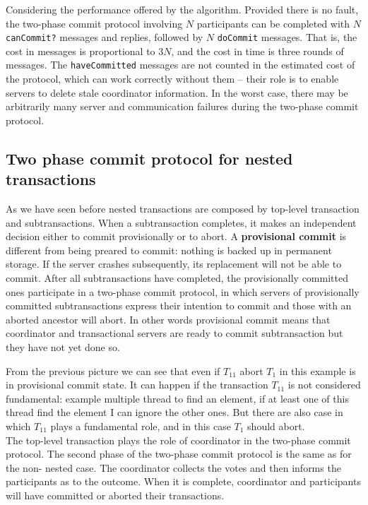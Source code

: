 Considering the performance offered by the algorithm. Provided there is no fault, the two-phase commit protocol involving $N$ participants can be completed with $N$ \verb|canCommit?| messages and replies, followed by $N$ \verb|doCommit| messages. That is, the cost in messages is proportional to $3N$, and the cost in time is three rounds of messages. The \verb|haveCommitted| messages are not counted in the estimated cost of the protocol, which can work correctly without them – their role is to enable servers to delete stale coordinator information. In the worst case, there may be arbitrarily many server and communication failures during the two-phase commit protocol. 	


\subsection{Two phase commit protocol for nested transactions}

As we have seen before nested transactions are composed by top-level transaction and subtransactions. When a subtransaction completes, it makes an independent decision either to commit provisionally or to abort. A \textbf{provisional commit} is different from being preared to commit: nothing is backed up in permanent storage. If the server crashes subsequently, its replacement will not be able to commit. After all subtransactions have completed, the provisionally committed ones participate in a two-phase commit protocol, in which servers of provisionally committed subtransactions express their intention to commit and those with an aborted ancestor will abort.
In other words provisional commit means that coordinator and transactional servers are ready to commit subtransaction but they have not yet done so.

From the previous picture we can see that even if $T_{11}$ abort $T_1$ in this example is in provisional commit state. It can happen if the transaction $T_{11}$ is not considered fundamental: example multiple thread to find an element, if at least one of this thread find the element I can ignore the other ones. But there are also case in which $T_{11}$ plays a fundamental role, and in this case $T_1$ should abort.\\

The top-level transaction plays the role of coordinator in the two-phase commit protocol. The second phase of the two-phase commit protocol is the same as for the non- nested case. The coordinator collects the votes and then informs the participants as to the outcome. When it is complete, coordinator and participants will have committed or aborted their transactions.



